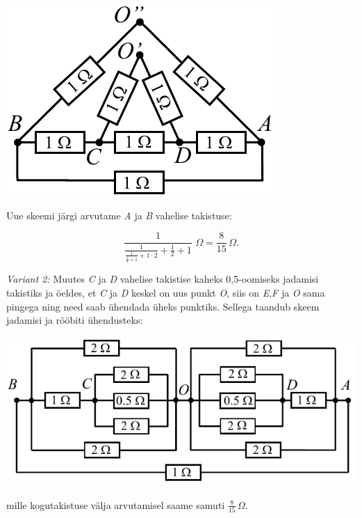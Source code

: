 \begin{center}
\includegraphics[scale=0.8]{2020-v3g-05-sol4.pdf}\\
\end{center}
Uue skeemi järgi arvutame \emph{A} ja \emph{B} vahelise takistuse:

$$ \frac{1}{\frac{1}{\displaystyle{\frac{1}{\frac{1}{2}+1} + 1 \cdot 2}}+\frac{1}{2}  + 1} \,\, \SI{}\Omega =\frac{8}{15} \, \SI{}\Omega.$$

\emph{Variant 2:} Muutes \emph{C} ja \emph{D} vahelise takistise kaheks 0,5-oomiseks jadamisi takistiks ja öeldes, et \emph{C} ja \emph{D} keskel on uus punkt \emph{O}, siis on \emph{E},\emph{F} ja \emph{O} sama pingega ning need saab ühendada üheks punktiks. Sellega taandub skeem jadamisi ja rööbiti ühendusteks:
\begin{center}
\includegraphics[scale=0.9]{2020-v3g-05-sol5.pdf}\\
\end{center}
mille kogutakistuse välja arvutamisel saame samuti $\frac{8}{15} \, \SI{}\Omega$.
\probend